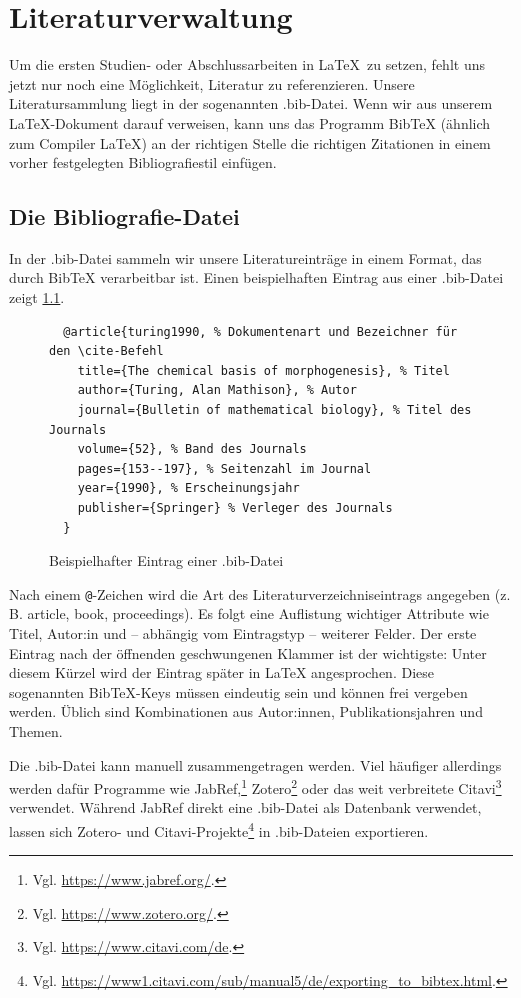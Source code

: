 \chapter{Literaturverwaltung}
\label{sec:literature}

Um die ersten Studien- oder Abschlussarbeiten in \LaTeX\ zu setzen, fehlt uns jetzt nur noch eine Möglichkeit, Literatur zu referenzieren.
Unsere Literatursammlung liegt in der sogenannten .bib-Datei.
Wenn wir aus unserem \LaTeX-Dokument darauf verweisen, kann uns das Programm Bib\TeX{} (ähnlich zum Compiler \LaTeX) an der richtigen Stelle die richtigen Zitationen in einem vorher festgelegten Bibliografiestil einfügen.

\section{Die Bibliografie-Datei}
In der .bib-Datei sammeln wir unsere Literatureinträge in einem Format, das durch Bib\TeX{} verarbeitbar ist.
Einen beispielhaften Eintrag aus einer .bib-Datei zeigt \cref{lst:bibfile-sample-entry}.

\begin{figure}[H]
  \begin{verbatim}
  @article{turing1990, % Dokumentenart und Bezeichner für den \cite-Befehl
    title={The chemical basis of morphogenesis}, % Titel
    author={Turing, Alan Mathison}, % Autor
    journal={Bulletin of mathematical biology}, % Titel des Journals
    volume={52}, % Band des Journals
    pages={153--197}, % Seitenzahl im Journal
    year={1990}, % Erscheinungsjahr
    publisher={Springer} % Verleger des Journals
  }
  \end{verbatim}
  \caption{Beispielhafter Eintrag einer .bib-Datei}
  \label{lst:bibfile-sample-entry}
\end{figure}

Nach einem \texttt{@}-Zeichen wird die Art des Literaturverzeichniseintrags angegeben (z.\,B. article, book, proceedings).
Es folgt eine Auflistung wichtiger Attribute wie Titel, Autor:in und – abhängig vom Eintragstyp – weiterer Felder.
Der erste Eintrag nach der öffnenden geschwungenen Klammer ist der wichtigste: 
Unter diesem Kürzel wird der Eintrag später in \LaTeX{} angesprochen.
Diese sogenannten Bib\TeX-Keys müssen eindeutig sein und können frei vergeben werden.
Üblich sind Kombinationen aus Autor:innen, Publikationsjahren und Themen.

Die .bib-Datei kann manuell zusammengetragen werden.
Viel häufiger allerdings werden dafür Programme wie JabRef,\footnote{Vgl. \url{https://www.jabref.org/}.} Zotero\footnote{Vgl. \url{https://www.zotero.org/}.} oder das weit verbreitete Citavi\footnote{Vgl. \url{https://www.citavi.com/de}.} verwendet.
Während JabRef direkt eine .bib-Datei als Datenbank verwendet, lassen sich Zotero- und Citavi-Projekte\footnote{Vgl. \url{https://www1.citavi.com/sub/manual5/de/exporting_to_bibtex.html}.} in .bib-Dateien exportieren.

